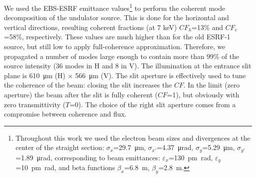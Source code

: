 \documentclass[9pt,twocolumn,twoside]{osajnl}
\begin{document}


We used the EBS-ESRF emittance values\footnote{Throughout this work we used the electron beam sizes and divergences at the center of the straight section: $\sigma_x$=\SI{29.7}{\micro\meter},
$\sigma_{x'}$=\SI{4.37}{\micro\radian},
$\sigma_y$=\SI{5.29}{\micro\meter},
$\sigma_{y'}$=\SI{1.89}{\micro\radian}, corresponding to beam emittances:  $\varepsilon_x$=\SI{130}{\pico\meter \radian},
$\varepsilon_y$=\SI{10}{\pico\meter \radian}, and beta functions
$\beta_x$=\SI{6.8}{\meter},
$\beta_y$=\SI{2.8}{\meter}.
}
to perform the coherent mode decomposition of the undulator source.
This is done for the horizontal and vertical directions, resulting coherent fractions (at 7 keV) $CF_h$=13\% and $CF_v$=58\%, respectively. These values are much higher than for the old ESRF-1 source, but still low to apply full-coherence approximation. Therefore, we propagated a number of modes large enough to contain more than 99\% of the source intensity (36 modes in H and 8 in V). The illumination at the entrance slit plane is \SI{610}{\micro\meter} (H) $\times$ \SI{566}{\micro\meter} (V). The slit aperture is effectively used to tune the coherence of the beam: closing the slit increases the $CF$. In the limit (zero aperture) the beam after the slit is fully coherent ($CF$=1), but obviously with zero transmittivity ($T$=0). The choice of the right slit aperture comes from a compromise between coherence and flux.  
\end{document}
